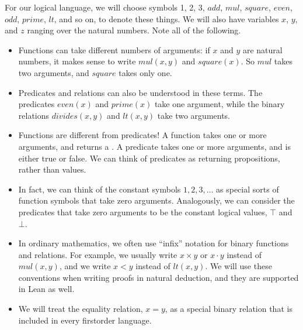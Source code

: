 \documentclass[letterpaper,10pt,english]{sphinxmanual}
\begin{document}
\sphinxAtStartPar
For our logical language, we will choose symbols 1, 2, 3, \(\mathit{add}\), \(\mathit{mul}\), \(\mathit{square}\), \(\mathit{even}\), \(\mathit{odd}\), \(\mathit{prime}\), \(\mathit{lt}\), and so on, to denote these things. We will also have variables \(x\), \(y\), and \(z\) ranging over the natural numbers. Note all of the following.
\begin{itemize}
\item {} 
\sphinxAtStartPar
Functions can take different numbers of arguments: if \(x\) and \(y\) are natural numbers, it makes sense to write \(\mathit{mul}(x, y)\) and \(\mathit{square}(x)\). So \(\mathit{mul}\) takes two arguments, and \(\mathit{square}\) takes only one.

\item {} 
\sphinxAtStartPar
Predicates and relations can also be understood in these terms. The predicates \(\mathit{even}(x)\) and \(\mathit{prime}(x)\) take one argument, while the binary relations \(\mathit{divides}(x, y)\) and \(\mathit{lt}(x,y)\) take two arguments.

\item {} 
\sphinxAtStartPar
Functions are different from predicates! A function takes one or more arguments, and returns a . A predicate takes one or more arguments, and is either true or false. We can think of predicates as returning propositions, rather than values.

\item {} 
\sphinxAtStartPar
In fact, we can think of the constant symbols \(1, 2, 3, \ldots\) as special sorts of function symbols that take zero arguments. Analogously, we can consider the predicates that take zero arguments to be the constant logical values, \(\top\) and \(\bot\).

\item {} 
\sphinxAtStartPar
In ordinary mathematics, we often use “infix” notation for binary functions and relations. For example, we usually write \(x \times y\) or \(x \cdot y\) instead of \(\mathit{mul}(x, y)\), and we write \(x < y\) instead of \(\mathit{lt}(x, y)\). We will use these conventions when writing proofs in natural deduction, and they are supported in Lean as well.

\item {} 
\sphinxAtStartPar
We will treat the equality relation, \(x = y\), as a special binary relation that is included in every first\sphinxhyphen{}order language.

\end{itemize}
\end{document}
